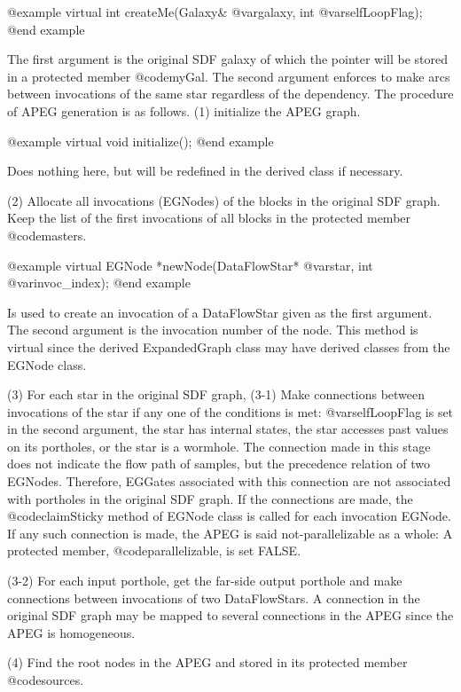 @example
virtual int createMe(Galaxy& @var{galaxy}, int @var{selfLoopFlag});
@end example

The first argument is the original SDF galaxy of which the pointer will
be stored in a protected member @code{myGal}. The second argument
enforces to make arcs between invocations of the same star regardless
of the dependency. The procedure of APEG generation is as follows.
(1) initialize the APEG graph.

@example
virtual void initialize();
@end example

Does nothing here, but will be redefined in the derived class if necessary.

(2) Allocate all invocations (EGNodes) of the blocks in the original SDF
graph. Keep the list of the first invocations of all blocks in the protected
member @code{masters}. 

@example
virtual EGNode *newNode(DataFlowStar* @var{star}, int @var{invoc_index});
@end example

Is used to create an invocation of a DataFlowStar given as the first
argument. The second argument is the invocation number of the node.
This method is virtual since the derived ExpandedGraph class may have
derived classes from the EGNode class.

(3) For each star in the original SDF graph, 
    (3-1) Make connections between invocations of the star if any one of the
          conditions is met: @var{selfLoopFlag} is set in the second argument,
          the star has internal states, the star accesses past values on its
          portholes, or the star is a wormhole. The connection made in this
          stage does not indicate the flow path of samples, but the
          precedence relation of two EGNodes. Therefore, EGGates associated
          with this connection are not associated with portholes in the
          original SDF graph. If the connections are made, 
          the @code{claimSticky} method of EGNode class is called for each
          invocation EGNode. If any such connection is made, the APEG
          is said not-parallelizable as a whole: A protected member,
          @code{parallelizable}, is set FALSE.

    (3-2) For each input porthole, get the far-side output porthole and make
          connections between invocations of two DataFlowStars. A connection
          in the original SDF graph may be mapped to several connections
          in the APEG since the APEG is homogeneous. 

(4) Find the root nodes in the APEG and stored in its protected member
    @code{sources}.

